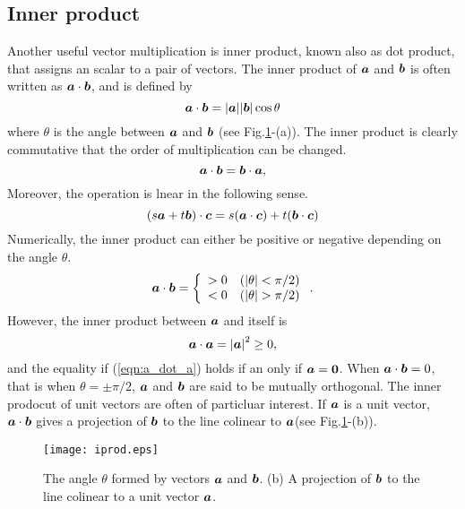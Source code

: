 \documentclass[10pt,a4j]{article}
\begin{document}
\subsection{Inner product} 
Another useful vector multiplication is inner product, known also as dot product, 
that assigns an scalar to a pair of vectors.  
The inner product of $\mbox{\boldmath $a$}$ and $\mbox{\boldmath $b$}$ is often written as $\mbox{\boldmath $a$}\cdot\mbox{\boldmath $b$}$, 
and is defined by 
\begin{equation}
	\mbox{\boldmath $a$}\cdot\mbox{\boldmath $b$}=|\mbox{\boldmath $a$}||\mbox{\boldmath $b$}|\cos\theta
	\label{eqn:idot_def}
\end{equation}
where $\theta$ is the angle between $\mbox{\boldmath $a$}$ and $\mbox{\boldmath $b$}$ (see Fig.\ref{fig:fig1_5}-(a)). 
The inner product is clearly commutative that the order of multiplication can be changed.
\begin{equation}
	\mbox{\boldmath $a$}\cdot\mbox{\boldmath $b$}
	=
	\mbox{\boldmath $b$}\cdot\mbox{\boldmath $a$}, 
	\label{eqn:}
\end{equation}
Moreover, the operation is lnear in the following sense.
\begin{equation}
	\left(s\mbox{\boldmath $a$}+t\mbox{\boldmath $b$}\right)\cdot\mbox{\boldmath $c$}
	=
	s(\mbox{\boldmath $a$}\cdot\mbox{\boldmath $c$})+t(\mbox{\boldmath $b$}\cdot \mbox{\boldmath $c$})
	\label{eqn:}
\end{equation}
Numerically, the inner product can either be positive or negative depending on the angle $\theta$.
\begin{equation}
	\mbox{\boldmath $a$}\cdot\mbox{\boldmath $b$}
	=
	\left\{
	\begin{array}{cc}
		>0 & ( |\theta|< \pi/2) \\
		<0 & ( |\theta| > \pi/2)
	\end{array}
	\right.
	.
	\label{eqn:}
\end{equation}
However, the inner product between $\mbox{\boldmath $a$}$ and itself is 
\begin{equation}
	\mbox{\boldmath $a$}\cdot \mbox{\boldmath $a$}=\left| \mbox{\boldmath $a$} \right|^2 \geq 0, 
	\label{eqn:a_dot_a}
\end{equation}
 and the equality if (\ref{eqn:a_dot_a}) holds if an only if $\mbox{\boldmath $a$}=\mbox{\boldmath $0$}$.
When $\mbox{\boldmath $a$}\cdot\mbox{\boldmath $b$}=0$, that is when $\theta=\pm \pi/2$, $\mbox{\boldmath $a$}$ and $\mbox{\boldmath $b$}$ 
are said to be mutually orthogonal. The inner prodocut of unit vectors are often of 
particluar interest. If $\mbox{\boldmath $a$}$ is a unit vector, $\mbox{\boldmath $a$}\cdot\mbox{\boldmath $b$}$ gives a projection 
of $\mbox{\boldmath $b$}$ to the line colinear to $\mbox{\boldmath $a$}$(see Fig.\ref{fig:fig1_5}-(b)). 
\begin{figure}[h]
	\begin{center}
	\texttt{[image: iprod.eps]} 
	\end{center}
	\caption{The angle $\theta$ formed by vectors $\mbox{\boldmath $a$}$ and $\mbox{\boldmath $b$}$. 
	(b) A projection of $\mbox{\boldmath $b$}$ to the line colinear to a unit vector $\mbox{\boldmath $a$}$.} 
	\label{fig:fig1_5}
\end{figure}
\end{document}
